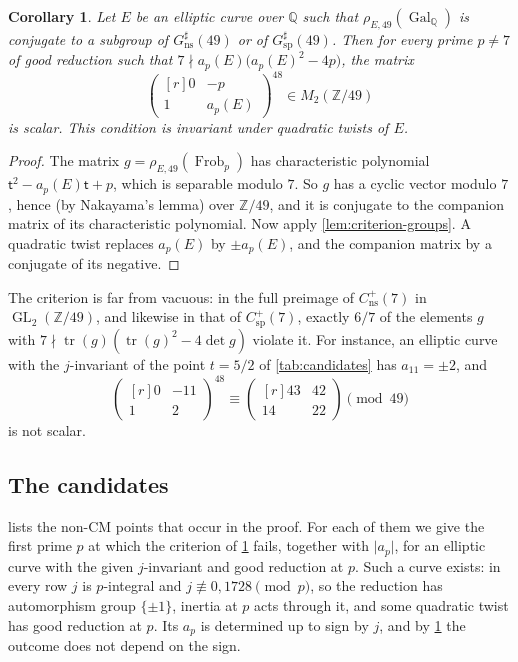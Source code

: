 \documentclass[12pt]{amsart}
\newcommand{\Q}{\mathbb{Q}}
\newcommand{\Z}{\mathbb{Z}}
\renewcommand{\t}{\mathsf{t}}
\DeclareMathOperator{\ns}{ns}
\DeclareMathOperator{\spc}{sp}
\DeclareMathOperator{\Gal}{Gal}
\newcommand{\Frob}{\operatorname{Frob}}
\newcommand{\GL}{\operatorname{GL}}
\numberwithin{equation}{section}
\newtheorem{corollary}[theorem]{Corollary}
\theoremstyle{definition}
\begin{document}
\begin{corollary}
  \label{cor:criterion}
  Let $E$ be an elliptic curve over $\Q$ such that $\rho_{E,49}(\Gal_\Q)$ is
  conjugate to a subgroup of $G_{\ns}^{\sharp}(49)$ or of
  $G_{\spc}^{\sharp}(49)$. Then for every prime $p \neq 7$ of good reduction such
  that $7 \nmid a_p(E)\bigl(a_p(E)^2 - 4p\bigr)$, the matrix
  \[
    \begin{pmatrix*}[r] 0 & -p \\ 1 & a_p(E) \end{pmatrix*}^{48} \in M_2(\Z/49)
  \]
  is scalar. This condition is invariant under quadratic twists of $E$.
\end{corollary}
\begin{proof}
  The matrix $g = \rho_{E,49}(\Frob_p)$ has characteristic polynomial $\t^2 -
  a_p(E)\t + p$, which is separable modulo $7$. So $g$ has a cyclic vector
  modulo $7$, hence (by Nakayama's lemma) over $\Z/49$, and it is conjugate to
  the companion matrix of its characteristic polynomial. Now apply
  \cref{lem:criterion-groups}. A quadratic twist replaces $a_p(E)$ by $\pm
  a_p(E)$, and the companion matrix by a conjugate of its negative.
\end{proof}

The criterion is far from vacuous: in the full preimage of $C^{+}_{\ns}(7)$ in
$\GL_2(\Z/49)$, and likewise in that of $C^{+}_{\spc}(7)$, exactly $6/7$ of the
elements $g$ with $7 \nmid \operatorname{tr}(g)(\operatorname{tr}(g)^2 - 4\det g)$
violate it. For instance, an elliptic curve with the $j$-invariant of the point
$t = 5/2$ of \cref{tab:candidates} has $a_{11} = \pm 2$, and
\[
  \begin{pmatrix*}[r] 0 & -11 \\ 1 & 2 \end{pmatrix*}^{48}
  \equiv \begin{pmatrix*}[r] 43 & 42 \\ 14 & 22 \end{pmatrix*} \pmod{49}
\]
is not scalar.

\subsection{The candidates}
 lists the non-CM points that occur in the proof. For each
of them we give the first prime $p$ at which the criterion of
\cref{cor:criterion} fails, together with $\lvert a_p\rvert$, for an elliptic
curve with the given $j$-invariant and good reduction at $p$. Such a curve
exists: in every row $j$ is $p$-integral and $j \not\equiv 0, 1728 \pmod p$, so
the reduction has automorphism group $\{\pm 1\}$, inertia at $p$ acts through
it, and some quadratic twist has good reduction at $p$. Its $a_p$ is determined
up to sign by $j$, and by \cref{cor:criterion} the outcome does not depend on
the sign.
\end{document}
